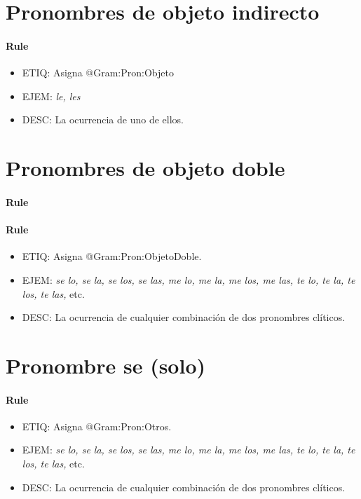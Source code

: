 \documentclass[11pt]{report}
\begin{document}
\section{Pronombres de objeto indirecto}
\paragraph*{Rule}
\begin{itemize}
\item ETIQ: Asigna @Gram:Pron:Objeto
\item EJEM: \emph{le, les}
\item DESC: La ocurrencia de uno de ellos.
\end{itemize}

\section{Pronombres de objeto doble}
\paragraph*{Rule}
\paragraph*{Rule}
\begin{itemize}
\item ETIQ: Asigna @Gram:Pron:ObjetoDoble.
\item EJEM: \emph{se lo, se la, se los, se las, me lo, me la, me los, me las, te lo, te la, te los, te las,} etc.
\item DESC: La ocurrencia de cualquier combinación de dos pronombres clíticos.
\end{itemize}

\section{Pronombre se (solo)}
\paragraph*{Rule}
\begin{itemize}
\item ETIQ: Asigna @Gram:Pron:Otros.
\item EJEM: \emph{se lo, se la, se los, se las, me lo, me la, me los, me las, te lo, te la, te los, te las,} etc.
\item DESC: La ocurrencia de cualquier combinación de dos pronombres clíticos.
\end{itemize}
\end{document}
